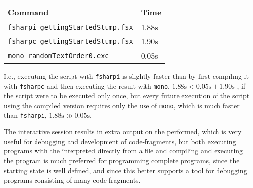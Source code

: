 \begin{center}
  \begin{tabular}{|l|l|}
    \hline
    Command & Time\\
    \hline
    \verb|fsharpi gettingStartedStump.fsx| & 1.88s\\
    \verb|fsharpc gettingStartedStump.fsx| & 1.90s\\
    \verb|mono randomTextOrder0.exe| & 0.05s\\
    \hline
\end{tabular}
\end{center}
I.e., executing the script with \verb|fsharpi| is slightly faster than by first compiling it with \verb|fsharpc| and then executing the result with \verb|mono|, $1.88\text{s} < 0.05\text{s}+1.90\text{s}$ , if the script were to be executed only once, but every future execution of the script using the compiled version requires only the use of \verb|mono|, which is much faster than \verb|fsharpi|, $1.88\text{s}\gg 0.05\text{s}$.

The interactive session results in extra output on the  performed, which is very useful for debugging and development of code-fragments, but both executing programs with the interpreted directly from a file and compiling and executing the program is much preferred for programming complete programs, since the starting state is well defined, and since this better supports  a tool for debugging programs consisting of many code-fragments.

\begin{comment}
  \section{Behind the scene}
  \jon{I'm not sure, whether it will be a good idea to describe this. Could be used as the umbrella for the specifikation of the program.} When a program is compiled or interpreted the following steps are performed by the system
  \begin{enumerate}
  \item Decoding
  \item Tokenization
  \item Lexical Filtering
  \item Parsing
  \item Importing
  \item Checking
  \item Elaboration
  \item Execution
  \end{enumerate}
\end{comment}

